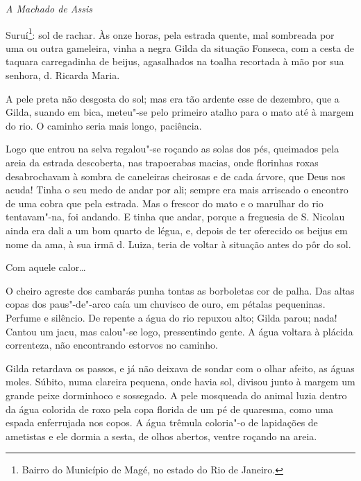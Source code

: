 
\hfill{}\emph{A Machado de Assis}

\bigskip

\noindent{}Suruí\footnote{Bairro do Município de Magé, no estado do Rio de Janeiro.}:
sol de rachar. Às onze horas, pela estrada quente, mal sombreada por uma
ou outra gameleira, vinha a negra Gilda da situação Fonseca, com a cesta
de taquara carregadinha de beijus, agasalhados na toalha recortada à mão
por sua senhora, d. Ricarda Maria.

A pele preta não desgosta do sol; mas era tão ardente esse de dezembro,
que a Gilda, suando em bica, meteu"-se pelo primeiro atalho para o mato
até à margem do rio. O caminho seria mais longo, paciência.

Logo que entrou na selva regalou"-se roçando as solas dos pés, queimados
pela areia da estrada descoberta, nas trapoerabas macias, onde florinhas
roxas desabrochavam à sombra de caneleiras cheirosas e de cada árvore,
que Deus nos acuda! Tinha o seu medo de andar por ali; sempre era mais
arriscado o encontro de uma cobra que pela estrada. Mas o frescor do
mato e o marulhar do rio tentavam"-na, foi andando. E tinha que andar,
porque a freguesia de S. Nicolau ainda era dali a um bom quarto de
légua, e, depois de ter oferecido os beijus em nome da ama, à sua irmã
d. Luiza, teria de voltar à situação antes do pôr do sol.

Com aquele calor\ldots{}

O cheiro agreste dos cambarás punha tontas as borboletas cor de palha.
Das altas copas dos paus"-de"-arco caía um chuvisco de ouro, em pétalas
pequeninas. Perfume e silêncio. De repente a água do rio repuxou alto;
Gilda parou; nada! Cantou um jacu, mas calou"-se logo, pressentindo
gente. A água voltara à plácida correnteza, não encontrando estorvos no
caminho.

Gilda retardava os passos, e já não deixava de sondar com o olhar
afeito, as águas moles. Súbito, numa clareira pequena, onde havia sol,
divisou junto à margem um grande peixe dorminhoco e sossegado. A pele
mosqueada do animal luzia dentro da água colorida de roxo pela copa
florida de um pé de quaresma, como uma espada enferrujada nos copos. A
água trêmula coloria"-o de lapidações de ametistas e ele dormia a sesta,
de olhos abertos, ventre roçando na areia.

